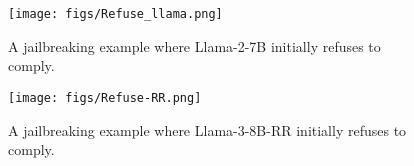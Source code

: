 \begin{figure}[t!]
     \centering
     \texttt{[image: figs/Refuse\_llama.png]}
     \vspace{-0.1in}
     \caption{A jailbreaking example where Llama-2-7B initially refuses to comply.}
     \label{llama2_example}
\end{figure}


\begin{figure}[t!]
     \centering
     \texttt{[image: figs/Refuse-RR.png]}
     \vspace{-0.2in}
     \caption{A jailbreaking example where Llama-3-8B-RR initially refuses to comply.}
     \label{llamaRR_example}
\end{figure}
